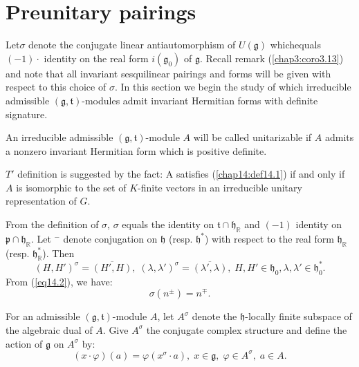 
\chapter{Preunitary pairings}\label{sec14}

Let\pageoriginale $\sigma$ denote the conjugate linear
antiautomorphism of $U(\mathfrak{g})$ which\break equals $(-1)\cdot$
identity on the real form $i(\mathfrak{g}_0)$ of
$\mathfrak{g}$. Recall remark (\ref{chap3:coro3.13}) and note that all invariant
sesquilinear pairings and forms will be given with respect to this
choice of $\sigma$. In this section we begin the study of which
irreducible admissible $(\mathfrak{g}, \mathfrak{t})$-modules admit
invariant Hermitian forms with definite signature. 

\begin{definition}\label{chap14:def14.1}
An irreducible admissible $(\mathfrak{g}, \mathfrak{t})$-module $A$
will be called unitarizable if $A$ admits a nonzero invariant
Hermitian form which is positive definite. 
\end{definition}

$T'$ definition is suggested by the fact: A satisfies (\ref{chap14:def14.1}) if and
only if $A$ is isomorphic to the set of $K$-finite vectors in an
irreducible unitary representation of $G$. 

From the definition of $\sigma$, $\sigma$ equals the identity on
$\mathfrak{t} \cap \mathfrak{h}_\mathbb{R}$ and $(-1)$ identity on
$\mathfrak{p} \cap \mathfrak{h}_\mathbb{R}$. Let $^-$ denote
conjugation  on $\mathfrak{h}$ (resp. $\mathfrak{h}^*$) with respect
to the real form $\mathfrak{h}_\mathbb{R}$
(resp. $\mathfrak{h}^*_\mathbb{R}$). Then 
\begin{equation*}
(H, H')^{\sigma} = \overline{(H', H)}, \;(\lambda, \lambda')^\sigma
  = \overline{(\lambda' ,  \lambda)}, \; H, H' \in \mathfrak{h}_0,
  \lambda, \lambda' \in \mathfrak{h}^*_0.  \tag{14.2}\label{eq14.2}
\end{equation*}
From (\ref{eq14.2}), we have:
\begin{equation*}
\sigma (n^{\pm}) = n^{\mp}.  \tag{14.3}\label{eq14.3}
\end{equation*}

For an admissible $(\mathfrak{g}, \mathfrak{t})$-module $A$, let
$A^\sigma$ denote the $\mathfrak{h}$-locally finite subspace of the
algebraic dual of $A$. Give $A^\sigma$ the conjugate complex structure
and define the action of $\mathfrak{g}$ on $A^\sigma$ by: 
\begin{equation*}
(x \cdot \varphi) (a) = \varphi (x^\sigma \cdot a), \; x \in
  \mathfrak{g}, \; \varphi \in  A^\sigma, \; a \in A.  \tag{14.4}\label{eq14.4}
\end{equation*}\pageoriginale


